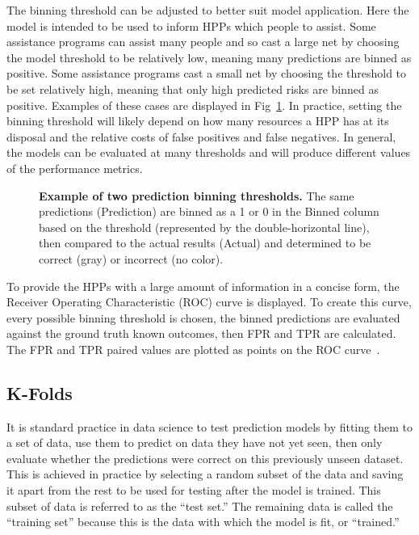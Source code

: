 \documentclass[10pt,letterpaper]{article}
\begin{document}
The binning threshold can be adjusted to better suit model application. Here the model is intended to be used to inform HPPs which people to assist. Some assistance programs can assist many people and so cast a large net by choosing the model threshold to be relatively low, meaning many predictions are binned as positive. Some assistance programs cast a small net by choosing the threshold to be set relatively high, meaning that only high predicted risks are binned as positive. Examples of these cases are displayed in Fig~\ref{fig:threshold_example}. In practice, setting the binning threshold will likely depend on how many resources a HPP has at its disposal and the relative costs of false positives and false negatives. In general, the models can be evaluated at many thresholds and will produce different values of the performance metrics. 

\begin{figure}[!h]
    \centering
    \caption{{\bf Example of two prediction binning thresholds.} The same predictions (Prediction) are binned as a 1 or 0 in the Binned column based on the threshold (represented by the double-horizontal line), then compared to the actual results (Actual) and determined to be correct (gray) or incorrect (no color).}
    \label{fig:threshold_example}
\end{figure}

To provide the HPPs with a large amount of information in a concise form, the Receiver Operating Characteristic (ROC) curve is displayed. To create this curve, every possible binning threshold is chosen, the binned predictions are evaluated against the ground truth known outcomes, then FPR and TPR are calculated. The FPR and TPR paired values are plotted as points on the ROC curve~\cite{fawcett2006introduction}.

\subsection*{K-Folds}
It is standard practice in data science to test prediction models by fitting them to a set of data, use them to predict on data they have not yet seen, then only evaluate whether the predictions were correct on this previously unseen dataset. This is achieved in practice by selecting a random subset of the data and saving it apart from the rest to be used for testing after the model is trained. This subset of data is referred to as the ``test set.'' The remaining data is called the ``training set'' because this is the data with which the model is fit, or ``trained.'' 
\end{document}
